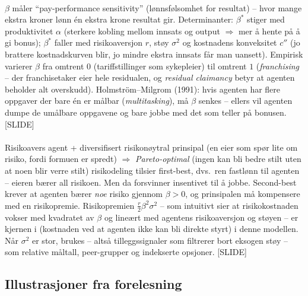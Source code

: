 \paragraph{\quad\SThree}
$\beta$ måler ``pay-performance sensitivity'' (lønnsfølsomhet for resultat) -- hvor mange ekstra kroner lønn én ekstra krone resultat gir. Determinanter: $\beta^{*}$ stiger med produktivitet $\alpha$ (sterkere kobling mellom innsats og output $\Rightarrow$ mer å hente på å gi bonus); $\beta^{*}$ faller med risikoaversjon $r$, støy $\sigma^{2}$ og kostnadens konveksitet $c''$ (jo brattere kostnadskurven blir, jo mindre ekstra innsats får man uansett). Empirisk varierer $\beta$ fra omtrent $0$ (tariffstillinger som sykepleier) til omtrent $1$ (\emph{franchising} -- der franchisetaker eier hele residualen, og \emph{residual claimancy} betyr at agenten beholder alt overskudd). Holmström--Milgrom (1991): hvis agenten har flere oppgaver der bare én er målbar (\emph{multitasking}), må $\beta$ senkes -- ellers vil agenten dumpe de umålbare oppgavene og bare jobbe med det som teller på bonusen. [SLIDE]

\paragraph{\quad\SThree}
Risikoavers agent + diversifisert risikonøytral prinsipal (en eier som spør lite om risiko, fordi formuen er spredt) $\Rightarrow$ \emph{Pareto-optimal} (ingen kan bli bedre stilt uten at noen blir verre stilt) risikodeling tilsier first-best, dvs.\ ren fastlønn til agenten -- eieren bærer all risikoen. Men da forsvinner insentivet til å jobbe. Second-best krever at agenten bærer \emph{noe} risiko gjennom $\beta>0$, og prinsipalen må kompensere med en risikopremie. Risikopremien $\tfrac{r}{2}\beta^{2}\sigma^{2}$ -- som intuitivt sier at risikokostnaden vokser med kvadratet av $\beta$ og lineært med agentens risikoaversjon og støyen -- er kjernen i  (kostnaden ved at agenten ikke kan bli direkte styrt) i denne modellen. Når $\sigma^{2}$ er stor, brukes  -- altså tilleggssignaler som filtrerer bort eksogen støy -- som relative måltall, peer-grupper og indekserte opsjoner. [SLIDE]

\subsection*{Illustrasjoner fra forelesning}

